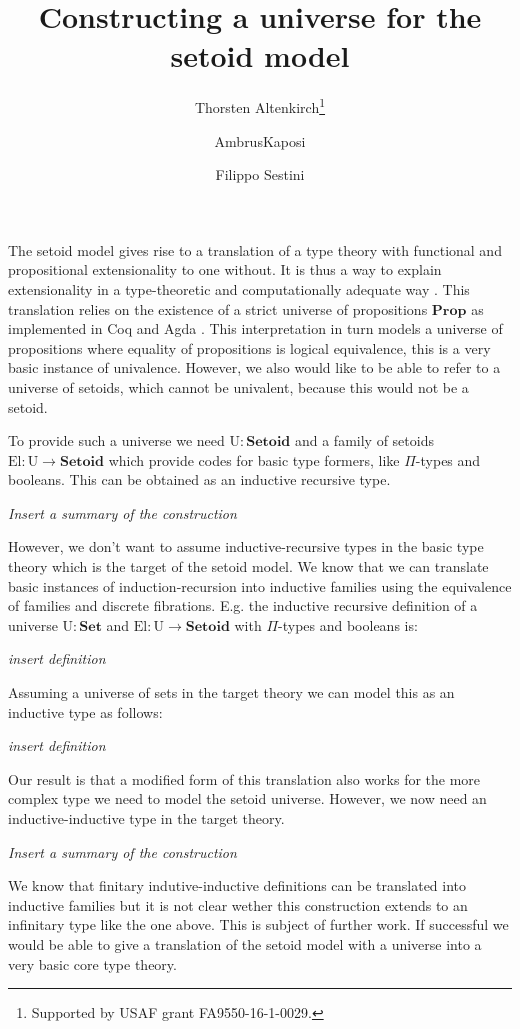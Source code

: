 \documentclass{easychair}
\title{Constructing a universe for the setoid model}
\author{Thorsten Altenkirch\inst{1}\thanks{Supported by USAF grant
    FA9550-16-1-0029.} \and AmbrusKaposi \inst{2} \and Filippo Sestini\inst{1}}
\institute{
  School of Computer Science, University of Nottingham, UK\\
  \email{\{psztxa,psxfs5\}@nottingham.ac.uk}
  \and
  E{\"o}tv{\"o}s Lor{\'a}nd University, Budapest, Hungary\\
  \email{akaposi@inf.elte.hu}
}
\newcommand{\Set}{\mathbf{Set}}
\newcommand{\Prop}{\mathbf{Prop}}
\newcommand{\Setoid}{\mathbf{Setoid}}
\newcommand{\U}{\mathrm{U}}
\newcommand{\El}{\mathrm{El}}
\begin{document}
\maketitle

The setoid model gives rise to a translation of a type theory with
functional and propositional extensionality to one without. It is thus
a way to explain extensionality in a type-theoretic and
computationally adequate way \cite{alti99,mpc19}. This translation
relies on the existence of a strict universe of propositions $\Prop$
as implemented in Coq and Agda \cite{Sprop}. This interpretation
in turn models a universe of propositions where equality of propositions
is logical equivalence, this is a very basic instance of
univalence. However, we also would like to be able to refer to a
universe of setoids, which cannot be univalent, because this would not
be a setoid. 

To provide such a universe we need $\U : \Setoid$ and a family of
setoids $\El : \U \to \Setoid$ which provide codes for basic type
formers, like $\Pi$-types and booleans. This can be obtained as an
inductive recursive type.

\emph{Insert a summary of the construction}

However, we don't want to assume inductive-recursive types in the
basic type theory which is the target of the setoid model. We know
that we can translate basic instances of induction-recursion into
inductive families using the equivalence of families and discrete
fibrations. E.g. the inductive recursive definition of a universe $\U:\Set$
and $\El : \U \to \Setoid$ with $\Pi$-types and booleans is:

\emph{insert definition}

Assuming a universe of sets in the target theory we can model this as
an inductive type as follows:

\emph{insert definition}

Our result is that a modified form of this translation also works for
the more complex type we need to model the setoid universe. However,
we now need an inductive-inductive type in the target theory.

\emph{Insert a summary of the construction}

We know that finitary indutive-inductive definitions can be translated
into inductive families \cite{jakob,ambroise} but it is not clear wether this construction
extends to an infinitary type like the one above. This is subject of
further work. If successful we would be able to give a translation of
the setoid model with a universe into a very basic core type theory.



\end{document}
